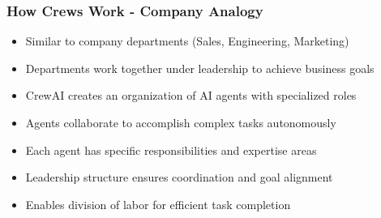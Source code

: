 \begin{frame}[fragile]\frametitle{How Crews Work - Company Analogy}
      \begin{itemize}
        \item Similar to company departments (Sales, Engineering, Marketing)
        \item Departments work together under leadership to achieve business goals
        \item CrewAI creates an organization of AI agents with specialized roles
        \item Agents collaborate to accomplish complex tasks autonomously
        \item Each agent has specific responsibilities and expertise areas
        \item Leadership structure ensures coordination and goal alignment
        \item Enables division of labor for efficient task completion
      \end{itemize}
\end{frame}


